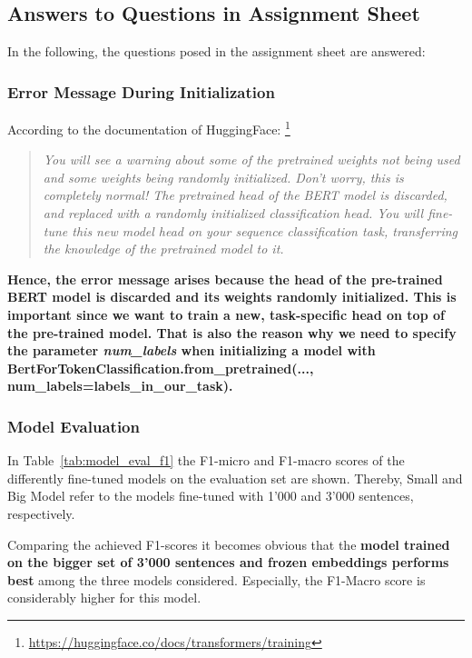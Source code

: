 \documentclass{article}
\begin{document}
\subsection{Answers to Questions in Assignment Sheet}
In the following, the questions posed in the assignment sheet are answered:

\subsubsection{Error Message During Initialization}

According to the documentation of HuggingFace: \footnote{\url{https://huggingface.co/docs/transformers/training}}

\begin{quote}
    \textit{You will see a warning about some of the pretrained weights not being used and some weights being randomly initialized. Don’t worry, this is completely normal! The pretrained head of the BERT model is discarded, and replaced with a randomly initialized classification head. You will fine-tune this new model head on your sequence classification task, transferring the knowledge of the pretrained model to it.}
\end{quote}

\textbf{Hence, the error message arises because the head of the pre-trained BERT model is discarded and its weights randomly initialized. This is important since we want to train a new, task-specific head on top of the pre-trained model. That is also the reason why we need to specify the parameter \textit{num\_labels} when initializing a model with BertForTokenClassification.from\_pretrained(..., num\_labels=labels\_in\_our\_task).}

\subsubsection{Model Evaluation}
In Table~\ref{tab:model_eval_f1} the F1-micro and F1-macro scores of the differently fine-tuned models on the evaluation set are shown. Thereby, Small and Big Model refer to the models fine-tuned with 1'000 and 3'000 sentences, respectively.

Comparing the achieved F1-scores it becomes obvious that the \textbf{model trained on the bigger set of 3'000 sentences and frozen embeddings performs best} among the three models considered. Especially, the F1-Macro score is considerably higher for this model.
\end{document}
